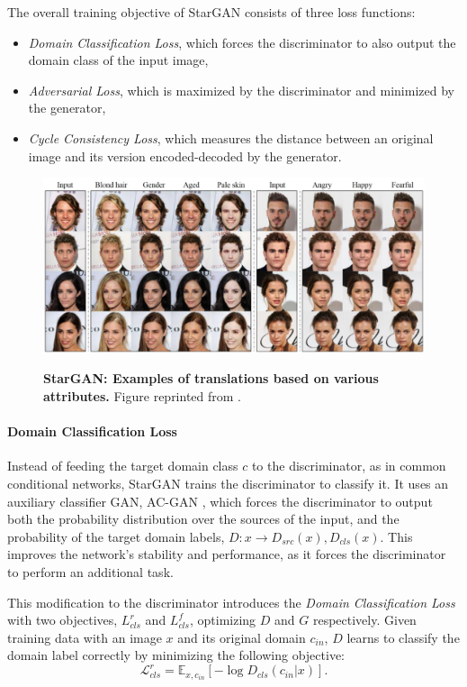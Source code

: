 \documentclass[12pt]{report}
\begin{document}
The overall training objective of StarGAN consists of three loss functions:
\begin{itemize}
\item \textit{Domain Classification Loss}, which forces the discriminator to also output the domain class of the input image,
\item \textit{Adversarial Loss}, which is maximized by the discriminator and minimized by the generator,
\item \textit{Cycle Consistency Loss}, which measures the distance between an original image and its version encoded-decoded by the generator.
\end{itemize}

\begin{figure}[h]
\centering
{\includegraphics[width=.8\linewidth]{03_analysis/gans/stargan_example}}
\caption{\label{fig:stargan_examples} \textbf{StarGAN: Examples of translations based on various attributes.} Figure reprinted from \cite{choi_stargan_2017}.}
\end{figure}

\paragraph{Domain Classification Loss} 
Instead of feeding the target domain class $c$ to the discriminator, as in common conditional networks, StarGAN trains the discriminator to classify it. It uses an auxiliary classifier GAN, AC-GAN \cite{odena_conditional_2016}, which forces the discriminator to output both the probability distribution over the sources of the input, and the probability of the target domain labels, $D: x \rightarrow {D_{src}(x), D_{cls}(x)}$. This improves the network's stability and performance, as it forces the discriminator to perform an additional task.

This modification to the discriminator introduces the \textit{Domain Classification Loss} with two objectives, ${L}^{r}_{cls}$ and ${L}^{f}_{cls}$, optimizing $D$ and $G$ respectively. Given training data with an image $x$ and its original domain $c_{in}$, $D$ learns to classify the domain label correctly by minimizing the following objective:
\begin{equation}
\mathcal{L}^{r}_{cls} = \mathbb{E}_{x,c_{in}}[-\log D_{cls}(c_{in}|x)].
\label{eq:stargan_clsr}
\end{equation}
\end{document}
